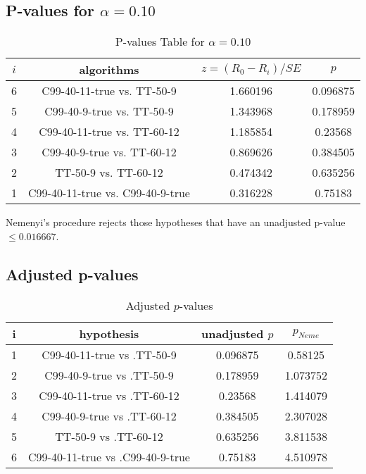 \documentclass[a4paper,10pt]{article}
\begin{document}
\begin{landscape}
\pagebreak

\subsection{P-values for $\alpha=0.10$}

\begin{table}[!htp]
\centering\scriptsize
\begin{tabular}{cccc}
$i$&algorithms&$z=(R_0 - R_i)/SE$&$p$\\
\hline6&C99-40-11-true vs. TT-50-9&1.660196&0.096875\\
5&C99-40-9-true vs. TT-50-9&1.343968&0.178959\\
4&C99-40-11-true vs. TT-60-12&1.185854&0.23568\\
3&C99-40-9-true vs. TT-60-12&0.869626&0.384505\\
2&TT-50-9 vs. TT-60-12&0.474342&0.635256\\
1&C99-40-11-true vs. C99-40-9-true&0.316228&0.75183\\
\hline
\end{tabular}
\caption{P-values Table for $\alpha=0.10$}
\end{table}Nemenyi's procedure rejects those hypotheses that have an unadjusted p-value $\le0.016667$.

\pagebreak

\subsection{Adjusted p-values}

\begin{table}[!htp]
\centering\scriptsize
\begin{tabular}{cccc}
i&hypothesis&unadjusted $p$&$p_{Neme}$\\
\hline1&C99-40-11-true vs .TT-50-9&0.096875&0.58125\\
2&C99-40-9-true vs .TT-50-9&0.178959&1.073752\\
3&C99-40-11-true vs .TT-60-12&0.23568&1.414079\\
4&C99-40-9-true vs .TT-60-12&0.384505&2.307028\\
5&TT-50-9 vs .TT-60-12&0.635256&3.811538\\
6&C99-40-11-true vs .C99-40-9-true&0.75183&4.510978\\
\hline
\end{tabular}
\caption{Adjusted $p$-values}
\end{table}

\end{landscape}
\end{document}
